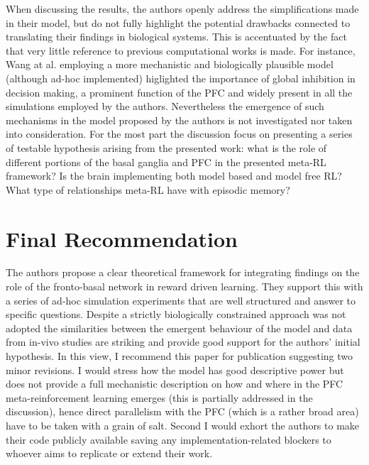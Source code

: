 \documentclass{article}
\begin{document}
When discussing the results, the authors openly address the simplifications made in their model, but do not fully highlight the potential drawbacks connected to translating their findings in biological systems. This is accentuated by the fact that very little reference to previous computational works is made. For instance, Wang at al. \cite{wang2002probabilistic} employing a more mechanistic and biologically plausible model (although ad-hoc implemented) higlighted the importance of global inhibition in decision making, a prominent function of the PFC and widely present in all the simulations employed by the authors. Nevertheless the emergence of such mechanisms in the model proposed by the authors is not investigated nor taken into consideration. For the most part the discussion focus on presenting a series of testable hypothesis arising from the presented work: what is the role of different portions of the basal ganglia and PFC in the presented meta-RL framework? Is the brain implementing both model based and model free RL? What type of relationships meta-RL have with episodic memory?  
\label{discussion}

\section{Final Recommendation}
\label{final_recommendation}
The authors propose a clear theoretical framework for integrating findings on the role of the fronto-basal network in reward driven learning. They support this with a series of ad-hoc simulation experiments that are well structured and answer to specific questions. Despite a strictly biologically constrained approach was not adopted the similarities between the emergent behaviour of the model and data from in-vivo studies are striking and provide good support for the authors' initial hypothesis. In this view, I recommend this paper for publication suggesting two minor revisions. I would stress how the model has good descriptive power but does not provide a full mechanistic description on how and where in the PFC meta-reinforcement learning emerges (this is partially addressed in the discussion), hence direct parallelism with the PFC (which is a rather broad area) have to be taken with a grain of salt. Second I would exhort the authors to make their code publicly available saving any implementation-related blockers to whoever aims to replicate or extend their work.

\printbibliography
\end{document}
